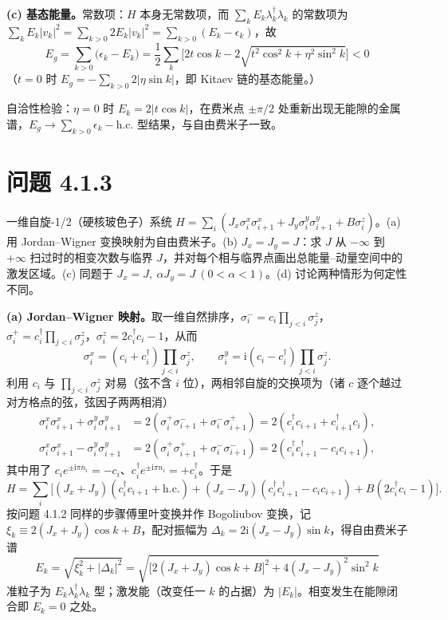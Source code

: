 \textbf{(c) 基态能量。}常数项：$H$ 本身无常数项，而 $\sum_kE_k\lambda^\dagger_k\lambda_k$ 的常数项为 $\sum_kE_k|v_k|^2=\sum_{k>0}2E_k|v_k|^2=\sum_{k>0}(E_k-\epsilon_k)$，故
\begin{equation*}
\boxed{\;E_g=\sum_{k>0}\big(\epsilon_k-E_k\big)
=\frac12\sum_k\Big[2t\cos k-2\sqrt{t^2\cos^2k+\eta^2\sin^2k}\Big]<0\;}
\end{equation*}
（$t=0$ 时 $E_g=-\sum_{k>0}2|\eta\sin k|$，即 Kitaev 链的基态能量。）

自洽性检验：$\eta=0$ 时 $E_k=2|t\cos k|$，在费米点 $\pm\pi/2$ 处重新出现无能隙的金属谱，$E_g\to\sum_{k>0}\epsilon_k-\text{h.c.}$ 型结果，与自由费米子一致。

\section*{问题 4.1.3}
\begin{problem}
一维自旋-1/2（硬核玻色子）系统 $H=\sum_i(J_x\sigma^x_i\sigma^x_{i+1}+J_y\sigma^y_i\sigma^y_{i+1}+B\sigma^z_i)$。(a) 用 Jordan--Wigner 变换映射为自由费米子。(b) $J_x=J_y=J$：求 $J$ 从 $-\infty$ 到 $+\infty$ 扫过时的相变次数与临界 $J$，并对每个相与临界点画出总能量--动量空间中的激发区域。(c) 同题于 $J_x=J,\ \alpha J_y=J\ (0<\alpha<1)$。(d) 讨论两种情形为何定性不同。
\end{problem}
\solution
\textbf{(a) Jordan--Wigner 映射。}取一维自然排序，$\sigma^-_i=c_i\prod_{j<i}\sigma^z_j$，$\sigma^+_i=c^\dagger_i\prod_{j<i}\sigma^z_j$，$\sigma^z_i=2c^\dagger_ic_i-1$，从而
\begin{equation*}
\sigma^x_i=(c_i+c^\dagger_i)\prod_{j<i}\sigma^z_j,\qquad
\sigma^y_i=\mathrm{i}(c_i-c^\dagger_i)\prod_{j<i}\sigma^z_j .
\end{equation*}
利用 $c_i$ 与 $\prod_{j<i}\sigma^z_j$ 对易（弦不含 $i$ 位），两相邻自旋的交换项为（诸 $c$ 逐个越过对方格点的弦，弦因子两两相消）
\begin{align*}
\sigma^x_i\sigma^x_{i+1}+\sigma^y_i\sigma^y_{i+1}&=2(\sigma^+_i\sigma^-_{i+1}+\sigma^-_i\sigma^+_{i+1})=2(c^\dagger_ic_{i+1}+c^\dagger_{i+1}c_i),\\
\sigma^x_i\sigma^x_{i+1}-\sigma^y_i\sigma^y_{i+1}&=2(\sigma^+_i\sigma^+_{i+1}+\sigma^-_i\sigma^-_{i+1})=2(c^\dagger_ic^\dagger_{i+1}-c_ic_{i+1}),
\end{align*}
其中用了 $c_i e^{\pm\mathrm{i}\pi n_i}=-c_i$、$c^\dagger_i e^{\pm\mathrm{i}\pi n_i}=+c^\dagger_i$。于是
\begin{equation*}
H=\sum_i\Big[(J_x+J_y)(c^\dagger_ic_{i+1}+\text{h.c.})+(J_x-J_y)(c^\dagger_ic^\dagger_{i+1}-c_ic_{i+1})+B(2c^\dagger_ic_i-1)\Big].
\end{equation*}
按问题 4.1.2 同样的步骤傅里叶变换并作 Bogoliubov 变换，记 $\xi_k\equiv2(J_x+J_y)\cos k+B$，配对振幅为 $\Delta_k=2\mathrm{i}(J_x-J_y)\sin k$，得自由费米子谱
\begin{equation*}
\boxed{\;E_k=\sqrt{\xi_k^2+|\Delta_k|^2}
=\sqrt{\big[2(J_x+J_y)\cos k+B\big]^2+4(J_x-J_y)^2\sin^2k}\;}
\end{equation*}
准粒子为 $E_k\lambda^\dagger_k\lambda_k$ 型；激发能（改变任一 $k$ 的占据）为 $|E_k|$。相变发生在能隙闭合即 $E_k=0$ 之处。

